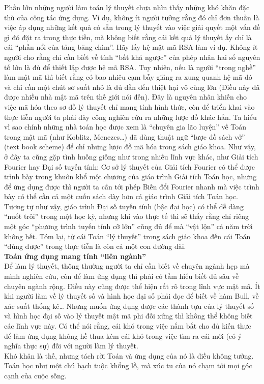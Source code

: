 \documentclass[12pt,a4paper]{report}
\begin{document}
    Phần lớn những người làm toán lý thuyết chưa nhìn thấy những khó khăn đặc thù của công tác ứng dụng. Ví dụ, không ít người tưởng rằng đó chỉ đơn thuần là việc áp dụng những kết quả có sẵn trong lý thuyết vào việc giải quyết một vấn đề gì đó đặt ra trong thực tiễn, mà không biết rằng cái kết quả lý thuyết ấy chỉ là cái “phần nổi của tảng băng chìm”. Hãy lấy hệ mật mã RSA làm ví dụ. Không ít người cho rằng chỉ cần biết về tính “bất khả ngược” của phép nhân hai số nguyên tố lớn là đủ để thiết lập được hệ mã RSA. Tuy nhiên, nếu là người “trong nghề” làm mật mã thì biết rằng có bao nhiêu cạm bẫy giăng ra xung quanh hệ mã đó và chỉ cần một chút sơ suất nhỏ là đủ dẫn đến thiệt hại vô cùng lớn (Điều này đã được nhiều nhà mật mã trên thế giới nói đến). Đây là nguyên nhân khiến cho việc mã hóa theo sơ đồ lý thuyết chỉ mang tính hình thức, còn để triển khai vào thực tiễn người ta phải dày công nghiên cứu ra những lược đồ khác hẳn. Ta hiểu vì sao chính những nhà toán học được xem là “chuyên gia lão luyện” về Toán trong mật mã (như Koblitz, Menezes…) đã dùng thuật ngữ “lược đồ sách vở” (text book scheme) để chỉ những lược đồ mã hóa trong sách giáo khoa. Như vậy, ở đây ta cũng gặp tình huống giống như trong nhiều lĩnh vực khác, như Giải tích Fourier hay Đại số tuyến tính: Cơ sở lý thuyết của Giải tích Fourier có thể được trình bày trong khuôn khổ một chương của giáo trình Giải tích Toán học, nhưng để ứng dụng được thì người ta cần tới phép Biến đổi Fourier nhanh mà việc trình bày có thể cần cả một cuốn sách dày hơn cả giáo trình Giải tích Toán học. Tương tự như vậy, giáo trình Đại số tuyến tính (bậc đại học) có thể dễ dàng “nuốt trôi” trong một học kỳ, nhưng khi vào thực tế thì sẽ thấy rằng chỉ riêng một góc “phương trình tuyến tính cỡ lớn” cũng đủ để mà “vật lộn” cả năm trời không hết. Tóm lại, từ cái Toán “lý thuyết” trong sách giáo khoa đến cái Toán “dùng được” trong thực tiễn là còn cả một con đường dài.\\
    \textbf{Toán ứng dụng mang tính “liên ngành”}\\
    Để làm lý thuyết, thông thường người ta chỉ cần biết về chuyên ngành hẹp mà mình nghiên cứu, còn để làm ứng dụng thì phải có tầm hiểu biết đủ sâu về chuyên ngành rộng. Điều này cũng được thể hiện rất rõ trong lĩnh vực mật mã. Ít khi người làm về lý thuyết số và hình học đại số  phải đọc để biết về hàm Bull, về xác suất thống kê… Nhưng muốn ứng dụng được các thành tựu của lý thuyết số và hình học đại số vào lý thuyết mật mã phi đối xứng thì không thể không biết các lĩnh vực này. Có thể nói rằng, cái khó trong việc nắm bắt cho đủ kiến thực để làm ứng dụng không hề thua kém cái khó trong việc tìm ra cái mới (có ý nghĩa thực sự) đối với người làm lý thuyết.\\
     Khó khăn là thế, nhưng tách rời Toán và ứng dụng của nó là điều không tưởng. Toán học như một chú bạch tuộc khổng lồ, mà xúc tu của nó chạm tới mọi góc cạnh của cuộc sống.
     
\end{document}
